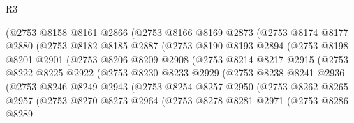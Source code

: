 \begin{lexlean}{R3}
\begin{coremodule}
                (@2753
                  @8158
                  @8161
                  @2866
                  (@2753
                    @8166
                    @8169
                    @2873
                    (@2753
                      @8174
                      @8177
                      @2880
                      (@2753
                        @8182
                        @8185
                        @2887
                        (@2753
                          @8190
                          @8193
                          @2894
                          (@2753
                            @8198
                            @8201
                            @2901
                            (@2753
                              @8206
                              @8209
                              @2908
                              (@2753
                                @8214
                                @8217
                                @2915
                                (@2753
                                  @8222
                                  @8225
                                  @2922
                                  (@2753
                                    @8230
                                    @8233
                                    @2929
                                    (@2753
                                      @8238
                                      @8241
                                      @2936
                                      (@2753
                                        @8246
                                        @8249
                                        @2943
                                        (@2753
                                          @8254
                                          @8257
                                          @2950
                                          (@2753
                                            @8262
                                            @8265
                                            @2957
                                            (@2753
                                              @8270
                                              @8273
                                              @2964
                                              (@2753
                                                @8278
                                                @8281
                                                @2971
                                                (@2753
                                                  @8286
                                                  @8289

\end{coremodule}
\end{lexlean}
